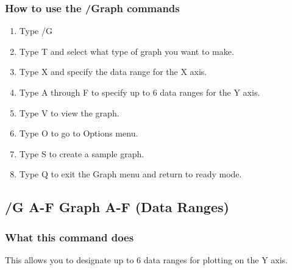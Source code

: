 \subsubsection*{How to use the /Graph commands}
\begin{enumerate}
\item{Type /G}
\item{Type T and select what type of graph you want to make.}
\item{Type X and specify the data range for the X axis.}
\item{Type A through F to specify up to 6 data ranges for the Y axis.}
\item{Type V to view the graph.}
\item{Type O to go to Options menu.}
\item{Type S to create a sample graph.}
\item{Type Q to exit the Graph menu and return to ready mode.}
\end{enumerate}

\subsection*{/G A-F  Graph A-F (Data Ranges)}

\subsubsection*{What this command does}
This allows you to designate up to 6 data ranges for plotting on the Y 
axis.

